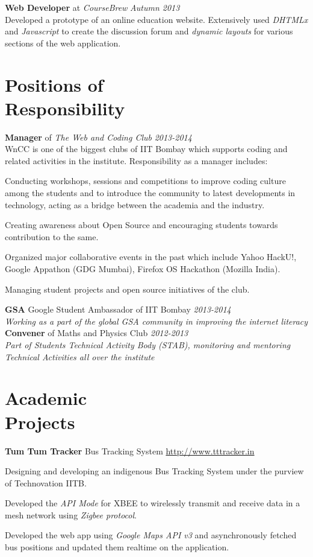\documentclass[margin,11pt]{resume}
\begin{document}
\begin{resume}
\textbf{Web Developer} at \emph{CourseBrew} \hfill \emph{Autumn 2013} \\
Developed a prototype of an online education website. Extensively used \emph{DHTMLx} and \emph{Javascript} to create the discussion forum and \emph{dynamic layouts} for various sections of the web application.

\section{\mysidestyle Positions of\\Responsibility } 


\textbf{Manager} of \emph{The Web and Coding Club} \hfill \emph{2013-2014}\\
WnCC is one of the biggest clubs of IIT Bombay which supports coding and related activities in the institute. Responsibility as a manager includes:
\begin{list2}
\item Conducting workshops, sessions and competitions to improve coding culture among the students and to introduce the community to latest developments in technology, acting as a bridge between the academia and the industry. 
\item Creating awareness about Open Source and encouraging students towards contribution to the same. 
\item Organized major collaborative events in the past which include Yahoo HackU!, Google Appathon (GDG Mumbai), Firefox OS Hackathon (Mozilla India). 
\item Managing student projects and open source initiatives of the club. 
\end{list2}
\textbf{GSA} Google Student Ambassador of IIT Bombay \hfill \emph{2013-2014} \\
\emph{Working as a part of the global GSA community in improving the internet literacy}
\textbf{Convener} of Maths and Physics Club \hfill \emph{2012-2013} \\
\emph{Part of Students Technical Activity Body (STAB), monitoring and mentoring Technical Activities all over the institute}

\vspace{20mm}
\section{\mysidestyle Academic\\Projects}

\textbf{Tum Tum Tracker} \hfill Bus Tracking System \hfill
    \url{http://www.tttracker.in}
\begin{list2}
\item Designing and developing an indigenous Bus Tracking System under the purview of Technovation IITB.
\item Developed the \emph{API Mode} for XBEE to wirelessly transmit and receive data in a mesh network using \emph{Zigbee protocol}.
\item Developed the web app using \emph{Google Maps API v3} and asynchronously fetched bus positions and updated them realtime  on the application.
\end{list2}


\end{resume}
\end{document}
